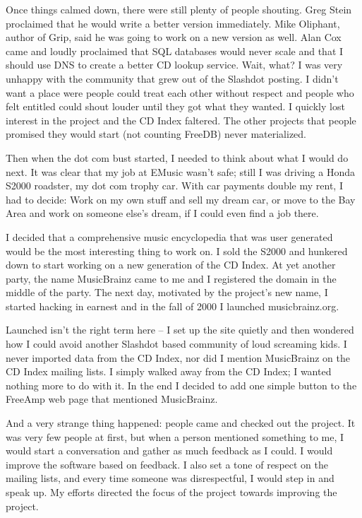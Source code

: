 Once things calmed down, there were still plenty of people shouting. Greg Stein proclaimed that he would write a better version immediately. Mike Oliphant, author of Grip, said he was going to work on a new version as well. Alan Cox came and loudly proclaimed that SQL databases would never scale and that I should use DNS to create a better CD lookup service. Wait, what?
I was very unhappy with the community that grew out of the Slashdot posting. I didn’t want a place were people could treat each other without respect and people who felt entitled could shout louder until they got what they wanted. I quickly lost interest in the project and the CD Index faltered. The other projects that people promised they would start (not counting FreeDB) never materialized.

Then when the dot com bust started, I needed to think about what I would do next. It was clear that my job at EMusic wasn’t safe; still I was driving a Honda S2000 roadster, my dot com trophy car. With car payments double my rent, I had to decide: Work on my own stuff and sell my dream car, or move to the Bay Area and work on someone else’s dream, if I could even find a job there.

I decided that a comprehensive music encyclopedia that was user generated would be the most interesting thing to work on. I sold the S2000 and hunkered down to start working on a new generation of the CD Index. At yet another party, the name MusicBrainz came to me and I registered the domain in the middle of the party. The next day, motivated by the project’s new name, I started hacking in earnest and in the fall of 2000 I launched musicbrainz.org.

Launched isn’t the right term here -- I set up the site quietly and then wondered how I could avoid another Slashdot based community of loud screaming kids. I never imported data from the CD Index, nor did I mention MusicBrainz on the CD Index mailing lists. I simply walked away from the CD Index; I wanted nothing more to do with it. In the end I decided to add one simple button to the FreeAmp web page that mentioned MusicBrainz.

And a very strange thing happened: people came and checked out the project. It was very few people at first, but when a person mentioned something to me, I would start a conversation and gather as much feedback as I could. I would improve the software based on feedback. I also set a tone of respect on the mailing lists, and every time someone was disrespectful, I would step in and speak up. My efforts directed the focus of the project towards improving the project. 

